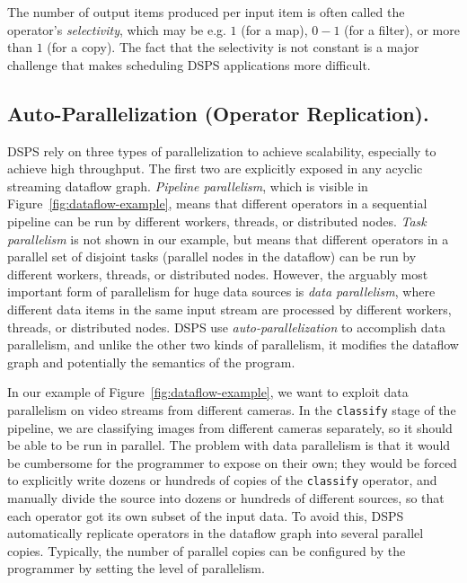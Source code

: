 The number of output items produced per input item is often called the operator's \emph{selectivity},
which may be e.g. $1$ (for a map), $0-1$ (for a filter), or more than $1$ (for a copy).
The fact that the selectivity is not constant is a major challenge that makes scheduling DSPS applications more difficult.

\subsection{Auto-Parallelization (Operator Replication).}

DSPS rely on three types of parallelization to achieve scalability, especially to achieve high throughput.
The first two are explicitly exposed in any acyclic streaming dataflow graph. \emph{Pipeline parallelism}, which is visible in Figure~\ref{fig:dataflow-example}, means that different operators in a sequential pipeline can be run by different workers, threads, or distributed nodes. \emph{Task parallelism} is not shown in our example, but means that different operators in a parallel set of disjoint tasks (parallel nodes in the dataflow) can be run by different workers, threads, or distributed nodes. However, the arguably most important form of parallelism for huge data sources is \emph{data parallelism}, where different data items in the same input stream are processed by different workers, threads, or distributed nodes.
DSPS use \emph{auto-parallelization} to accomplish data parallelism, and unlike the other two kinds of parallelism, it modifies the dataflow graph and potentially the semantics of the program.

In our example of Figure~\ref{fig:dataflow-example}, we want to exploit data parallelism on video streams from different cameras. In the \texttt{classify} stage of the pipeline, we are classifying images from different cameras separately, so it should be able to be run in parallel.
The problem with data parallelism is that it would be cumbersome for the programmer to expose on their own; they would be forced to explicitly write dozens or hundreds of copies of the \texttt{classify} operator, and manually divide the source into dozens or hundreds of different sources, so that each operator got its own subset of the input data.
To avoid this, DSPS automatically replicate operators in the dataflow graph into several parallel copies. Typically, the number of parallel copies can be configured by the programmer by setting the level of parallelism.

